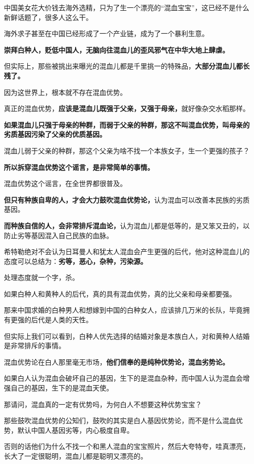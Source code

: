 \documentclass[UTF8, 11pt, oneside]{ctexart}
\newcommand{\zd}[1]{\textbf{\textcolor[RGB]{123,12,0}{#1}}} %
\begin{document}
中国美女花大价钱去海外选精，只为了生一个漂亮的“混血宝宝”，这已经不是什么新鲜话题了，很多人这么干。

海外求子甚至在中国已经形成了一个产业链，成为了一个暴利生意。

\zd{崇拜白种人，贬低中国人，无脑向往混血儿的歪风邪气在中华大地上肆虐。}

但实际上，那些被挑出来曝光的混血儿都是千里挑一的特殊品，\zd{大部分混血儿都长残了。}

因为这世界上，根本就不存在混血优势。

真正的混血优势，\zd{应该是混血儿既强于父亲，又强于母亲，}就好像杂交水稻那样。

\zd{如果混血儿只强于母亲的种群，而弱于父亲的种群，那这不叫混血优势，叫母亲的劣质基因污染了父亲的优质基因。}

混血儿弱于父亲的种群，那这个父亲为啥不找一个本族女子，生一个更强的孩子？

\zd{所以拆穿混血优势这个谣言，是非常简单的事情。}

混血优势这个谣言，在全世界都很普及。

\zd{但只有种族自卑的人，才会大力鼓吹混血优势论，}认为混血可以改善本民族的劣质基因。

\zd{而种族自信的人，会非常排斥混血论，}认为混血儿都是低等的，是又笨又丑的，以防止劣等基因混入自己民族的血脉。

希特勒绝对不会认为日耳曼人和犹太人混血会产生更强的后代，他对这种混血儿的态度可以总结为：\zd{劣等，恶心，杂种，污染源。}

处理态度就一个字，杀。

如果白种人和黄种人的后代，真的具有混血优势，真的比父亲和母亲都要强。

那来中国求婚的白种男人和想嫁到中国的白种女人，应该排几万米的长队，毕竟拥有更强的后代是人类的天性。

但实际上我们可以看到，白种人优先选择的结婚对象是本族白人，对和黄种人结婚是非常排斥的事情。

混血优势论在白人那里毫无市场，\zd{他们信奉的是纯种优势论，混血劣势论。}

如果白人认为混血会破坏自己的基因，生下的是混血杂种，而中国人认为混血会增强自己的基因，生下的是混血天使。

那请问，混血真的一定有优势吗，为何白人不想要这种优势宝宝？

那些鼓吹混血优势的公知们，鼓吹的其实是白人基因优势论，而不是什么混血优势，默认中国人基因劣等，内心极度自卑。

否则的话他们为什么不找一个和黑人混血的宝宝照片，然后大夸特夸，哇真漂亮，长大了一定很聪明，混血儿都是聪明又漂亮的。
\end{document}
